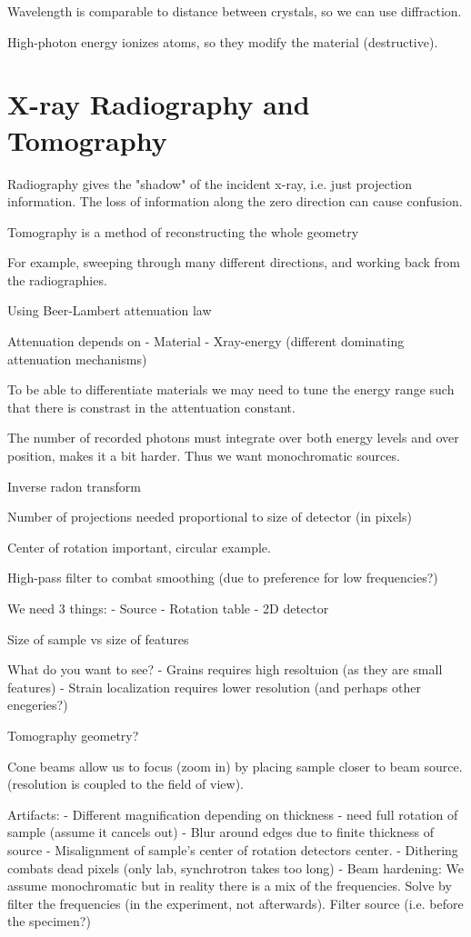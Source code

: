 Wavelength is comparable to distance between crystals, so we can use diffraction.

High-photon energy ionizes atoms, so they modify the material (destructive). 



\section{X-ray Radiography and Tomography}
Radiography gives the "shadow" of the incident x-ray, i.e. just projection information. The loss of information along the zero direction can cause confusion.

Tomography is a method of reconstructing the whole geometry

For example, sweeping through many different directions, and working back from the radiographies.

Using Beer-Lambert attenuation law

Attenuation depends on
- Material
- Xray-energy (different dominating attenuation mechanisms)

To be able to differentiate materials we may need to tune the energy range such that there is constrast in the attentuation constant.

The number of recorded photons must integrate over both energy levels and over position, makes it a bit harder. Thus we want monochromatic sources.

Inverse radon transform

Number of projections needed proportional to size of detector (in pixels)

Center of rotation important, circular example.

High-pass filter to combat smoothing (due to preference for low frequencies?)

We need 3 things:
	- Source
	- Rotation table
	- 2D detector

Size of sample vs size of features

What do you want to see?
	- Grains requires high resoltuion (as they are small features)
	- Strain localization requires lower resolution (and perhaps other enegeries?)


Tomography geometry?

Cone beams allow us to focus (zoom in) by placing sample closer to beam source. (resolution is coupled to the field of view).

Artifacts:
	- Different magnification depending on thickness - need full rotation of sample (assume it cancels out)
	- Blur around edges due to finite thickness of source
	- Misalignment of sample's center of rotation detectors center.
	- Dithering combats dead pixels (only lab, synchrotron takes too long)
	- Beam hardening: We assume monochromatic but in reality there is a mix of the frequencies. Solve by filter the frequencies (in the experiment, not afterwards). Filter source (i.e. before the specimen?)

